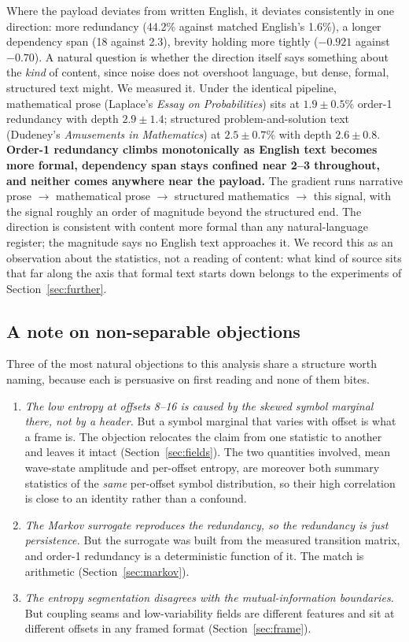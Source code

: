 \documentclass[11pt,a4paper]{article}
\begin{document}
Where the payload deviates from written English, it deviates consistently in one
direction: more redundancy (44.2\% against matched English's 1.6\%), a longer
dependency span (18 against 2.3), brevity holding more tightly ($-0.921$ against
$-0.70$). A natural question is whether the direction itself says something about the
\emph{kind} of content, since noise does not overshoot language, but dense, formal,
structured text might. We measured it. Under the identical pipeline, mathematical
prose (Laplace's \emph{Essay on Probabilities}) sits at $1.9 \pm 0.5$\% order-1
redundancy with depth $2.9 \pm 1.4$; structured problem-and-solution text (Dudeney's
\emph{Amusements in Mathematics}) at $2.5 \pm 0.7$\% with depth $2.6 \pm 0.8$.
\textbf{Order-1 redundancy climbs monotonically as English text becomes more formal,
dependency span stays confined near 2--3 throughout, and neither comes anywhere near
the payload.} The gradient runs narrative prose $\rightarrow$
mathematical prose $\rightarrow$ structured mathematics $\rightarrow$ this signal,
with the signal roughly an order of magnitude beyond the structured end. The direction
is consistent with content more formal than any natural-language register; the
magnitude says no English text approaches it. We record this as an observation about
the statistics, not a reading of content: what kind of source sits that far along the
axis that formal text starts down belongs to the experiments of
Section~\ref{sec:further}.

\subsection{A note on non-separable objections}

Three of the most natural objections to this analysis share a structure worth naming,
because each is persuasive on first reading and none of them bites.

\begin{enumerate}[leftmargin=1.6em,itemsep=3pt]
\item \emph{The low entropy at offsets 8--16 is caused by the skewed symbol marginal
there, not by a header.} But a symbol marginal that varies with offset is what a frame
is. The objection relocates the claim from one statistic to another and leaves it
intact (Section~\ref{sec:fields}). The two quantities involved, mean wave-state amplitude
and per-offset entropy, are moreover both summary statistics of the \emph{same}
per-offset symbol distribution, so their high correlation is close to an identity rather
than a confound.
\item \emph{The Markov surrogate reproduces the redundancy, so the redundancy is just
persistence.} But the surrogate was built from the measured transition matrix, and
order-1 redundancy is a deterministic function of it. The match is arithmetic
(Section~\ref{sec:markov}).
\item \emph{The entropy segmentation disagrees with the mutual-information boundaries.}
But coupling seams and low-variability fields are different features and sit at
different offsets in any framed format (Section~\ref{sec:frame}).
\end{enumerate}
\end{document}
